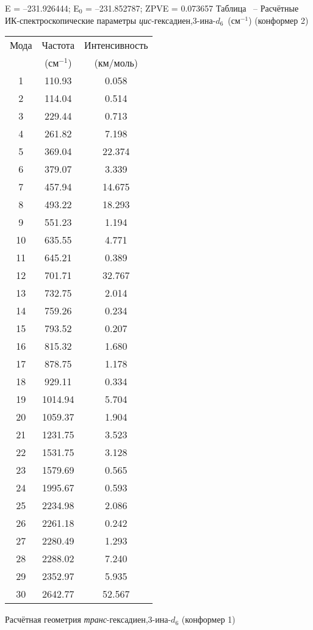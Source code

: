 {E =  --231.926444;    E$_0$ =  --231.852787; ZPVE = 0.073657
\newpage {}
Таблица \thet\, -- Расчётные ИК-спектроскопические параметры {\itshape цис}-гексадиен,3\nobreakdash-ина-$d_6$~(см$^{-1}$) (конформер 2)
 \begin{center}
\begin{tabular}{ccc}
Мода & Частота   & Интенсивность \\
&(см$^{-1}$)&(км/моль)\\
 \hline
    1 &  110.93 &    0.058 \\
    2 &  114.04 &     0.514 \\
    3 &  229.44 &     0.713 \\
    4 &  261.82 &     7.198 \\
    5 &  369.04 &  22.374 \\
    6 &  379.07 &     3.339 \\
    7 &  457.94 &    14.675 \\
    8 &  493.22 &    18.293 \\
    9 &  551.23 &     1.194 \\
   10 &  635.55 &    4.771 \\
   11 &  645.21 &     0.389 \\
   12 &  701.71 &    32.767 \\
   13 &  732.75 &     2.014 \\
   14 &  759.26 &     0.234 \\
   15 &  793.52 &     0.207 \\
   16 &  815.32 &     1.680 \\
   17 &  878.75 &     1.178 \\
   18 &  929.11 &     0.334 \\
   19 & 1014.94 &     5.704 \\
   20 & 1059.37 &     1.904 \\
   21 & 1231.75 &    3.523 \\
   22 & 1531.75 &     3.128 \\
   23 & 1579.69 &     0.565 \\
   24 & 1995.67 &     0.593 \\
   25 & 2234.98 &     2.086 \\
   26 & 2261.18 &    0.242 \\
   27 & 2280.49 &     1.293 \\
   28 & 2288.02 &     7.240 \\
   29 & 2352.97 &     5.935 \\
   30 & 2642.77 &    52.567 \\
 \end{tabular}
\end{center}
\newpage
Расчётная геометрия {\itshape транс}-гексадиен,3\nobreakdash-ина-$d_6$ (конформер 1)

}
